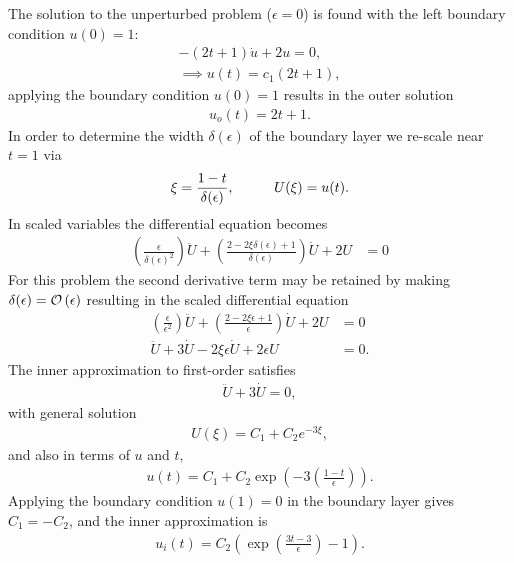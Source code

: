   The solution to the unperturbed problem ($\epsilon = 0$) is found with the left boundary condition $u(0) = 1$:
  \begin{align*}
    - (2t + 1)\dot{u} + 2u = 0, \\
    \implies u(t) = c_1(2t + 1),
  \end{align*}
  applying the boundary condition $u(0) = 1$ results in the outer solution
  \begin{align*}
    u_o(t) = 2t + 1.
  \end{align*}
  In order to determine the width $\delta(\epsilon)$ of the  boundary layer we re-scale near $t=1$ via
  \begin{align*}
    \xi = \frac{1 - t}{\delta(\epsilon)}, \hspace{10mm} U(\xi) = u(t).
  \end{align*}
  In scaled variables the differential equation becomes
  \begin{align*}
    \left( \frac{\epsilon}{\delta(\epsilon)^2} \right) \ddot{U} + \left( \frac{2 - 2\xi\delta(\epsilon) + 1}{\delta(\epsilon)}\right)\dot{U} + 2U &= 0 
  \end{align*}
  For this problem the second derivative term may be retained by making $\delta(\epsilon) = \mathcal{O}\left(\epsilon\right)$ resulting in the scaled differential equation
  \begin{align*}
    \left( \frac{\epsilon}{\epsilon^2} \right) \ddot{U} + \left( \frac{2 - 2\xi\epsilon + 1}{\epsilon}\right)\dot{U} + 2U &= 0 \\ 
    \ddot{U} + 3\dot{U} - 2\xi\epsilon \dot{U} + 2\epsilon U &= 0.
  \end{align*}
  The inner approximation to first-order satisfies
  \begin{align*}
    \ddot{U} + 3\dot{U} = 0,
  \end{align*}
  with general solution
  \begin{align*}
    U(\xi) = C_1 + C_2 e^{-3\xi},
  \end{align*}
  and also in terms of $u$ and $t$,
  \begin{align*}
    u(t) = C_1 + C_2 \exp\left( -3\left( \frac{1 - t}{\epsilon} \right) \right).
  \end{align*}
  Applying the boundary condition $u(1) = 0$ in the boundary layer gives $C_1 = -C_2$, and the inner approximation is
  \begin{align*}
    u_i(t) = C_2 \left( \exp\left( \frac{3t - 3}{\epsilon} \right) - 1 \right).
  \end{align*}

